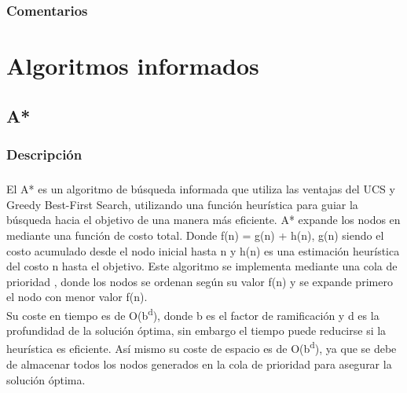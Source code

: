 \documentclass{report}
\begin{document}
        \subsection*{Comentarios}
          \paragraph*{}{

          }
    \chapter{Algoritmos informados}
      \section{A*}
        \subsection*{Descripción}
          \paragraph*{}{
            El A* es un algoritmo de búsqueda informada que utiliza las ventajas del UCS y Greedy Best-First Search, utilizando una función heurística para guiar la búsqueda hacia el objetivo de una manera más eficiente. A* expande los nodos en mediante una función de costo total. Donde f(n) = g(n) + h(n), g(n) siendo el costo acumulado desde el nodo inicial hasta n y h(n) es una estimación heurística del costo n hasta el objetivo. Este algoritmo se implementa mediante una cola de prioridad , donde los nodos se ordenan según su valor f(n) y se expande primero el nodo con menor valor f(n).\\
            Su coste en tiempo es de O(b\textsuperscript{d}), donde b es el factor de ramificación y d es la profundidad de la solución óptima, sin embargo el tiempo puede reducirse si la heurística es eficiente. Así mismo su coste de espacio es de  O(b\textsuperscript{d}), ya que se debe de almacenar todos los nodos generados en la cola de prioridad para asegurar la solución óptima.
          }
\end{document}
